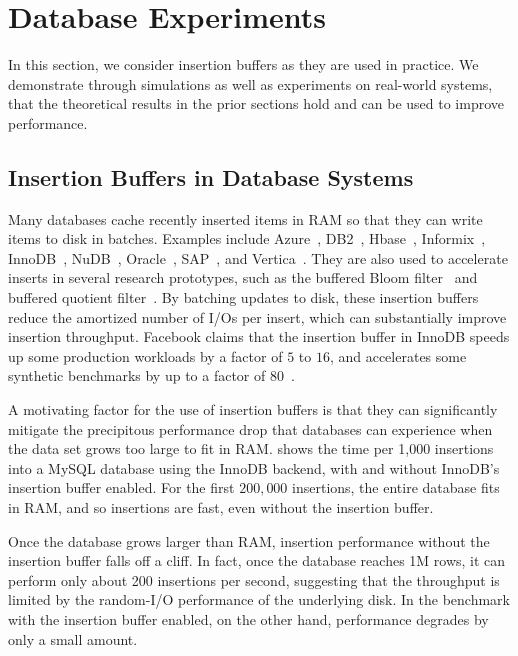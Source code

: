 
\section{Database Experiments}\label{sec:experiments}
In this section, we consider insertion buffers as they are used in practice. We
demonstrate through simulations as well as experiments on real-world systems,
that the theoretical results in the prior sections hold and can be used to
improve performance.

\subsection{Insertion Buffers in Database Systems}
Many databases cache recently inserted items in RAM so that they can write
items to disk in batches.  Examples include
Azure~\cite{Azure16}, 
DB2~\cite{IBM17},  
Hbase~\cite{Xiang12}, 
Informix~\cite{Informix}, 
InnoDB~\cite{Callaghan11},  
NuDB~\cite{NuDB16},  
Oracle~\cite{Oracle17},  
SAP~\cite{SAP17},  and 
Vertica~\cite{Vertica17}.
They are also used to accelerate inserts in several research prototypes, such
as the buffered Bloom
filter~\cite{CanimLaMi10} and buffered quotient
filter~\cite{BenderFaJo12}.  
By batching updates to disk, these insertion buffers reduce the amortized
number of I/Os per insert, which can substantially improve insertion
throughput.  Facebook claims that the insertion buffer in InnoDB speeds up some
production workloads by a factor of $5$ to $16$, and accelerates some synthetic
benchmarks by up to a factor of $80$~\cite{Callaghan11}.

A motivating factor for the use of insertion buffers is that they can
significantly mitigate the precipitous performance drop that databases can
experience when the data set grows too large to fit in RAM.
 shows the time per 1,000 insertions into a MySQL
database using the InnoDB backend, with and without InnoDB's insertion buffer
enabled.  For the first $200,000$ insertions, the entire database fits in RAM,
and so insertions are fast, even without the insertion buffer.

Once the database grows larger than RAM, insertion performance without the
insertion buffer falls off a cliff.  In fact, once the database reaches 1M
rows, it can perform only about 200 insertions per second, suggesting that the
throughput is limited by the random-I/O performance of the underlying disk.  In
the benchmark with the insertion buffer enabled, on the other hand, performance
degrades by only a small amount.

